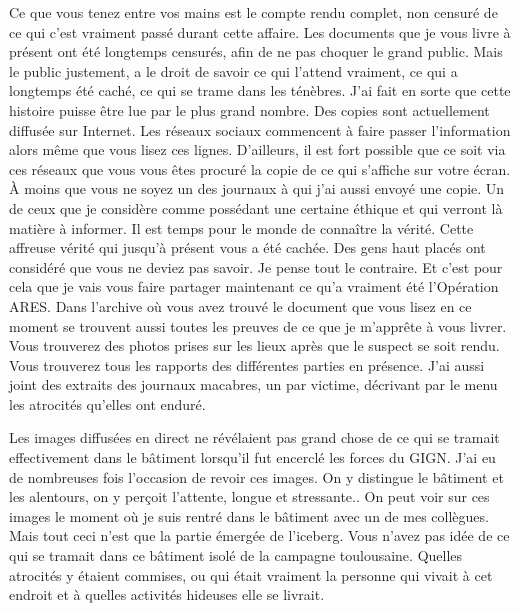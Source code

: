Ce que vous tenez entre vos mains est le compte rendu complet, non censuré de 
ce qui c’est vraiment passé durant cette affaire. Les documents que je vous 
livre à présent ont été longtemps censurés, afin de ne pas choquer le grand 
public. Mais le public justement, a le droit de savoir ce qui l'attend 
vraiment, ce qui a longtemps été caché, ce qui se trame dans les ténèbres. J’ai 
fait en sorte que cette histoire puisse être lue par le plus grand nombre. Des 
copies sont actuellement diffusée sur Internet. Les réseaux sociaux 
commencent à faire passer l’information alors même que vous lisez ces lignes. 
D’ailleurs, il est fort possible que ce soit via ces réseaux que vous vous êtes
procuré la copie de ce qui s’affiche sur votre écran. À moins que vous ne soyez 
un des journaux à qui j'ai aussi envoyé une copie. Un de ceux que je considère 
comme possédant une certaine éthique et qui verront là matière à informer. Il 
est temps pour le monde de connaître la vérité. Cette affreuse vérité qui 
jusqu’à présent vous a été cachée. Des gens haut placés ont considéré que vous 
ne deviez pas savoir. Je pense tout le contraire. Et c’est pour cela que je 
vais vous faire partager maintenant ce qu’a vraiment été l’Opération ARES. Dans 
l’archive où vous avez trouvé le document que vous lisez en ce moment se 
trouvent aussi toutes les preuves de ce que je m’apprête à vous livrer. Vous
trouverez des photos prises sur les lieux après que le suspect se soit rendu. 
Vous trouverez tous les rapports des différentes parties en présence. J’ai 
aussi joint des extraits des journaux macabres, un par victime, décrivant par 
le menu les atrocités qu’elles ont enduré.

Les images diffusées en direct ne révélaient pas grand chose de ce qui se 
tramait effectivement dans le bâtiment lorsqu’il fut encerclé les forces du 
GIGN. J’ai eu de nombreuses fois l’occasion de revoir ces images. On y 
distingue le bâtiment et les alentours, on y perçoit l’attente, longue et 
stressante.. On peut voir sur ces images le moment où je suis rentré dans le 
bâtiment avec un de mes collègues. Mais tout ceci n’est que la partie émergée 
de l’iceberg. Vous n’avez pas idée de ce qui se tramait dans ce bâtiment isolé 
de la campagne toulousaine. Quelles atrocités y étaient commises, ou qui était 
vraiment la personne qui vivait à cet endroit et à quelles activités hideuses 
elle se livrait.

